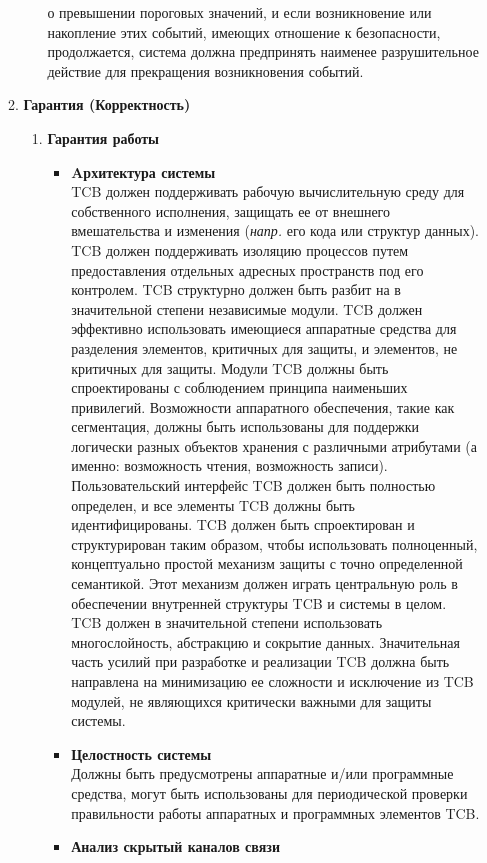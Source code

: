 \begin{enumerate}
\begin{enumerate}
\begin{enumerate}
			о превышении пороговых значений, и если возникновение или накопление этих событий, имеющих отношение к безопасности, продолжается, система должна предпринять наименее 
			разрушительное действие для прекращения возникновения событий.
		\end{enumerate}
		\item{\textbf{Гарантия (Корректность)}}
		\begin{enumerate}
		\item{\textbf{Гарантия работы}}
			\begin{itemize}
				\item{\textbf{Aрхитектура системы}}\\
				TCB должен поддерживать рабочую вычислительную среду для собственного исполнения, защищать ее от внешнего вмешательства и изменения  (\textit{напр.} его кода или структур данных).
				TCB должен поддерживать изоляцию процессов путем предоставления отдельных адресных пространств под его контролем. TCB структурно должен быть разбит на в значительной степени
				независимые модули. TCB должен эффективно использовать имеющиеся аппаратные средства для разделения элементов, критичных для защиты, и элементов, не критичных для защиты.
				Модули TCB должны быть спроектированы с соблюдением принципа наименьших привилегий. Возможности аппаратного обеспечения, такие как сегментация, должны быть использованы 
				для поддержки логически разных объектов хранения с различными атрибутами (а именно: возможность чтения, возможность записи). Пользовательский интерфейс TCB должен быть полностью 
				определен, и все элементы TCB должны быть идентифицированы. TCB должен быть спроектирован и структурирован таким образом, чтобы использовать полноценный, концептуально
				простой механизм защиты с точно определенной семантикой. Этот механизм должен играть центральную роль в обеспечении внутренней структуры TCB и системы в целом. TCB должен 
				в значительной степени использовать многослойность, абстракцию и сокрытие данных. Значительная часть усилий при разработке и реализации TCB должна быть направлена на 
				минимизацию ее сложности и исключение из TCB модулей, не являющихся критически важными для защиты системы.
				\item{\textbf{Целостность системы}}\\
				Должны быть предусмотрены аппаратные и/или программные средства, могут быть использованы для периодической проверки правильности работы аппаратных и программных элементов TCB.
				\item{\textbf{Анализ скрытый каналов связи}}\\

\end{itemize}
\end{enumerate}
\end{enumerate}
\end{enumerate}
